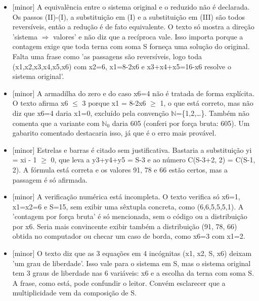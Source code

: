 \documentclass{article}%
\begin{document}
\begin{itemize}%
\item%
{[}minor{]} A equivalência entre o sistema original e o reduzido não é declarada. Os passos (II)-(I), a substituição em (I) e a substituição em (III) são todos reversíveis, então a redução é de fato equivalente. O texto só mostra a direção 'sistema $\Rightarrow$ valores' e não diz que a recíproca vale. Isso importa porque a contagem exige que toda terna com soma S forneça uma solução do original. Falta uma frase como 'as passagens são reversíveis, logo toda (x1,x2,x3,x4,x5,x6) com x2=6, x1=8-2x6 e x3+x4+x5=16-x6 resolve o sistema original'.%
\item%
{[}minor{]} A armadilha do zero e do caso x6=4 não é tratada de forma explícita. O texto afirma x6 $\leq$ 3 porque x1 = 8-2x6 $\geq$ 1, o que está correto, mas não diz que x6=4 daria x1=0, excluído pela convenção $\mathbb{N}$=\{1,2,\ldots{}\}. Também não comenta que a variante com $\mathbb{N}$$_{0}$ daria 605 (conferi por força bruta: 605). Um gabarito comentado destacaria isso, já que é o erro mais provável.%
\item%
{[}minor{]} Estrelas e barras é citado sem justificativa. Bastaria a substituição yi = xi - 1 $\geq$ 0, que leva a y3+y4+y5 = S-3 e ao número C(S-3+2, 2) = C(S-1, 2). A fórmula está correta e os valores 91, 78 e 66 estão certos, mas a passagem é só afirmada.%
\item%
{[}minor{]} A verificação numérica está incompleta. O texto verifica só x6=1, x1=x2=6 e S=15, sem exibir uma sêxtupla concreta, como (6,6,5,5,5,1). A 'contagem por força bruta' é só mencionada, sem o código ou a distribuição por x6. Seria mais convincente exibir também a distribuição (91, 78, 66) obtida no computador ou checar um caso de borda, como x6=3 com x1=2.%
\item%
{[}minor{]} O texto diz que as 3 equações em 4 incógnitas (x1, x2, S, x6) deixam 'um grau de liberdade'. Isso vale para o sistema em S, mas o sistema original tem 3 graus de liberdade nas 6 variáveis: x6 e a escolha da terna com soma S. A frase, como está, pode confundir o leitor. Convém esclarecer que a multiplicidade vem da composição de S.%
\end{itemize}%
\end{document}
